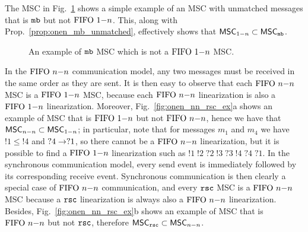The MSC in Fig.~\ref{fig:mb_no_onen} shows a simple example of an MSC with unmatched messages that is $\mathtt{mb}$ but not $\text{FIFO } 1\mathsf{-}n$. This, along with Prop.~\ref{prop:onen_mb_unmatched}, effectively shows that $\mathsf{MSC}_{1\mathsf{-}n} \subset \mathsf{MSC}_{\mathtt{mb}}$.

\begin{figure}[h]
	\begin{center}
		\caption{An example of $\mathtt{mb}$ MSC which is not a $\text{FIFO } 1\mathsf{-}n$ MSC.}
		\label{fig:mb_no_onen}
	\end{center}
\end{figure}

\medskip 

In the $\text{FIFO } n\mathsf{-}n$ communication model, any two messages must be received in the same order as they are sent. It is then easy to observe that each $\text{FIFO } n\mathsf{-}n$ MSC is a $\text{FIFO } 1\mathsf{-}n$ MSC, because each $\text{FIFO } n\mathsf{-}n$ linearization is also a $\text{FIFO } 1\mathsf{-}n$ linearization. Moreover, Fig.~\ref{fig:onen_nn_rsc_ex}a shows an example of MSC that is $\text{FIFO } 1\mathsf{-}n$ but not $\text{FIFO } n\mathsf{-}n$, hence we have that $\mathsf{MSC}_{n\mathsf{-}n} \subset \mathsf{MSC}_{1\mathsf{-}n}$; in particular, note that for messages $m_1$ and $m_4$ we have $!1 \le !4$ and $?4 \to ?1$, so there cannot be a $\text{FIFO } n\mathsf{-}n$ linearization, but it is possible to find a $\text{FIFO } 1\mathsf{-}n$ linearization such as $!1\;!2\;?2\;!3\;?3\;!4\;?4\;?1$. In the synchronous communication model, every send event is immediately followed by its corresponding receive event. Synchronous communication is then clearly a special case of $\text{FIFO } n\mathsf{-}n$ communication, and every $\mathtt{rsc}$ MSC is a $\text{FIFO } n\mathsf{-}n$ MSC because a $\mathtt{rsc}$ linearization is always also a $\text{FIFO } n\mathsf{-}n$ linearization. Besides, Fig.~\ref{fig:onen_nn_rsc_ex}b shows an example of MSC that is $\text{FIFO } n\mathsf{-}n$ but not $\mathtt{rsc}$, therefore $\mathsf{MSC}_{\mathtt{rsc}} \subset \mathsf{MSC}_{n\mathsf{-}n}$.

